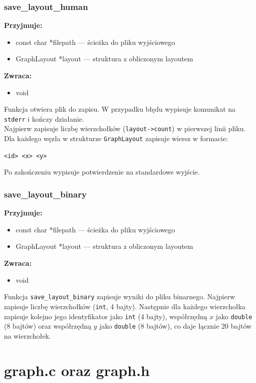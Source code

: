 \documentclass[12pt]{article}
\begin{document}
\subsubsection{save\_layout\_human}
\textbf{Przyjmuje:}
\begin{itemize}
	\item const char *filepath --- ścieżka do pliku wyjściowego
	\item GraphLayout *layout --- struktura z obliczonym layoutem
\end{itemize}
\textbf{Zwraca:}
\begin{itemize}
	\item void
\end{itemize}
Funkcja otwiera plik do zapisu. W przypadku błędu wypisuje komunikat na \texttt{stderr}
i kończy działanie.\\
Najpierw zapisuje liczbę wierzchołków (\texttt{layout->count}) w pierwszej linii pliku.\\
Dla każdego węzła w strukturze \texttt{GraphLayout} zapisuje wiersz w formacie:
\begin{center}
	\texttt{<id> <x> <y>}
\end{center}
Po zakończeniu wypisuje potwierdzenie na standardowe wyjście.

\subsubsection{save\_layout\_binary}
\textbf{Przyjmuje:}
\begin{itemize}
	\item const char *filepath --- ścieżka do pliku wyjściowego
	\item GraphLayout *layout --- struktura z obliczonym layoutem
\end{itemize}
\textbf{Zwraca:}
\begin{itemize}
	\item void
\end{itemize}
Funkcja \texttt{save\_layout\_binary} zapisuje wyniki do pliku binarnego.
Najpierw zapisuje liczbę wierzchołków (\texttt{int}, 4 bajty). Następnie dla każdego wierzchołka
zapisuje kolejno jego identyfikator jako \texttt{int} (4 bajty), współrzędną
$x$ jako \texttt{double} (8 bajtów) oraz współrzędną $y$ jako \texttt{double}
(8 bajtów), co daje łącznie 20 bajtów na wierzchołek.

\section{graph.c oraz graph.h}
\end{document}
